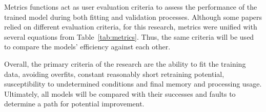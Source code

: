 %
Metrics functions act as user evaluation criteria to assess the performance of the trained model during both fitting and validation processes.
Although some papers relied on different evaluation criteria, for this research, metrics were unified with several equations from \mbox{Table~\ref{tab:metrics}}.
Thus, the same criteria will be used to compare the models' efficiency against each other.
\begin{table}[htbp]
    \renewcommand{\arraystretch}{1.3}
    \caption{Model's metrics functions}
    \centering
    \label{tab:metrics}
\end{table}

%
Overall, the primary criteria of the research are the ability to fit the training data, avoiding overfits, constant reasonably short retraining potential, susceptibility to undetermined conditions and final memory and processing usage.
Ultimately, all models will be compared with their successes and faults to determine a path for potential improvement.
